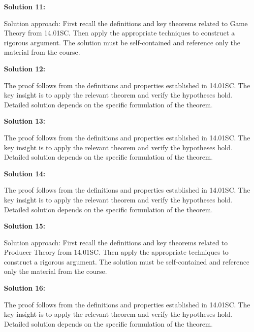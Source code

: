 \documentclass[12pt,a4paper]{exam}
\begin{document}
\vspace{0.5cm}

\textbf{Solution 11:}

Solution approach: First recall the definitions and key theorems related to Game Theory from 14.01SC. Then apply the appropriate techniques to construct a rigorous argument. The solution must be self-contained and reference only the material from the course.

\vspace{0.5cm}

\textbf{Solution 12:}

The proof follows from the definitions and properties established in 14.01SC. The key insight is to apply the relevant theorem and verify the hypotheses hold. Detailed solution depends on the specific formulation of the theorem.

\vspace{0.5cm}

\textbf{Solution 13:}

The proof follows from the definitions and properties established in 14.01SC. The key insight is to apply the relevant theorem and verify the hypotheses hold. Detailed solution depends on the specific formulation of the theorem.

\vspace{0.5cm}

\textbf{Solution 14:}

The proof follows from the definitions and properties established in 14.01SC. The key insight is to apply the relevant theorem and verify the hypotheses hold. Detailed solution depends on the specific formulation of the theorem.

\vspace{0.5cm}

\textbf{Solution 15:}

Solution approach: First recall the definitions and key theorems related to Producer Theory from 14.01SC. Then apply the appropriate techniques to construct a rigorous argument. The solution must be self-contained and reference only the material from the course.

\vspace{0.5cm}

\textbf{Solution 16:}

The proof follows from the definitions and properties established in 14.01SC. The key insight is to apply the relevant theorem and verify the hypotheses hold. Detailed solution depends on the specific formulation of the theorem.
\end{document}
